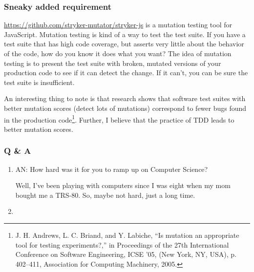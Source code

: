 \subsubsection{Sneaky added requirement}
\url{https://github.com/stryker-mutator/stryker-js} is a mutation testing tool for JavaScript.
Mutation testing is kind of a way to test the test suite.
If you have a test suite that has high code coverage, but asserts very little about the behavior of the code, how do you know it does what you want?
The idea of mutation testing is to present the test suite with broken, mutated versions of your production code to see if it can detect the change.
If it can't, you can be sure the test suite is insufficient.

An interesting thing to note is that research shows that software test suites with better mutation scores (detect lots of mutations) correspond to fewer bugs found in the production code\footnote{J. H. Andrews, L. C. Briand, and Y. Labiche, ``Is mutation an appropriate tool for testing experiments?,'' in Proceedings of the 27th International Conference on Software Engineering, ICSE ’05, (New York, NY, USA), p. 402–411, Association for Computing Machinery, 2005.}.
Further, I believe that the practice of TDD leads to better mutation scores.

\subsubsection{Q \& A}
\begin{enumerate}
    \item AN: How hard was it for you to ramp up on Computer Science?

    Well, I've been playing with computers since I was eight when my mom bought me a TRS-80.
    So, maybe not hard, just a long time.
    \item
\end{enumerate}